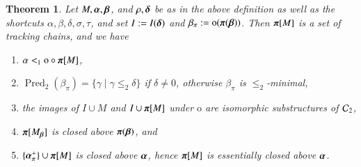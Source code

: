 \documentclass[3p,10pt,times]{elsarticle}
\newcommand{\al}{\alpha}
\newcommand{\alvec}{{\vec{\al}}}
\newcommand{\be}{\beta}
\newcommand{\bevec}{{\vec{\be}}}
\newcommand{\ga}{\gamma}
\newcommand{\de}{\delta}
\newcommand{\devec}{{\vec{\de}}}
\newcommand{\si}{\sigma}
\newcommand{\lo}{<_1}
\newcommand{\pivec}{\vec{\pi}}
\newcommand{\Ctwo}{{{\cal C}_2}}
\newtheorem{theo}{Theorem}[section]
\newcommand{\letwo}{\le_2}
\newcommand{\ov}{\mathrm{o}}
\newcommand{\predecs}{\operatorname{Pred}}
\def\vec#1{\mathchoice{\mbox{\boldmath$\displaystyle#1$}}
{\mbox{\boldmath$\textstyle#1$}}
{\mbox{\boldmath$\scriptstyle#1$}}
{\mbox{\boldmath$\scriptscriptstyle#1$}}}
\begin{document}
\begin{theo}\label{pitctheo} Let $M,\alvec,\bevec$, and $\rho,\devec$ be as in the above definition as well as the shortcuts
$\al,\be,\de,\si,\tau$, and set $I:=I(\devec)$ and $\be_\pi:=\ov(\pivec(\bevec))$. 
Then $\pivec[M]$ is a set of tracking chains, and we have 
\begin{enumerate}
\item $\al\lo\ov\circ\pivec[M]$,
\item $\predecs_2(\be_\pi)=\{\ga\mid\ga\letwo\de\}$ if $\de\not=0$, 
otherwise $\be_\pi$ is $\letwo$-minimal,
\item the images of $I\cup M$ and $I\cup \pivec[M]$ under $\ov$ are isomorphic substructures of $\Ctwo$, 
\item $\pivec[M_\bevec]$ is closed above $\pivec(\bevec)$, and
\item $\{\alvec^+_\pi\}\cup\pivec[M]$ is closed above $\alvec$, hence $\pivec[M]$ is essentially closed above $\alvec$.
\end{enumerate}
\end{theo}
\end{document}
